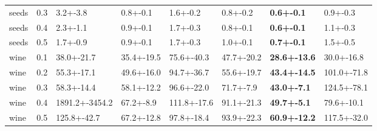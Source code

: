 \begin{tabular}{lrllllll}
        seeds &           0.3 &          3.2+-3.8 &               0.8+-0.1 &       1.6+-0.2 &       0.8+-0.2 &       \textbf{0.6+-0.1} &       0.9+-0.3 \\
        seeds &           0.4 &          2.3+-1.1 &               0.9+-0.1 &       1.7+-0.3 &       0.8+-0.1 &       \textbf{0.6+-0.1} &       1.1+-0.3 \\
        seeds &           0.5 &          1.7+-0.9 &               0.9+-0.1 &       1.7+-0.3 &       1.0+-0.1 &       \textbf{0.7+-0.1} &       1.5+-0.5 \\
         wine &           0.1 &        38.0+-21.7 &             35.4+-19.5 &     75.6+-40.3 &     47.7+-20.2 &     \textbf{28.6+-13.6} &     30.0+-16.8 \\
         wine &           0.2 &        55.3+-17.1 &             49.6+-16.0 &     94.7+-36.7 &     55.6+-19.7 &     \textbf{43.4+-14.5} &    101.0+-71.8 \\
         wine &           0.3 &        58.3+-14.4 &             58.1+-12.2 &     96.6+-22.0 &      71.7+-7.9 &      \textbf{43.0+-7.1} &    124.5+-78.1 \\
         wine &           0.4 &    1891.2+-3454.2 &              67.2+-8.9 &    111.8+-17.6 &     91.1+-21.3 &      \textbf{49.7+-5.1} &     79.6+-10.1 \\
         wine &           0.5 &       125.8+-42.7 &             67.2+-12.8 &     97.8+-18.4 &     93.9+-22.3 &     \textbf{60.9+-12.2} &    117.5+-32.0 \\
\bottomrule
\end{tabular}



